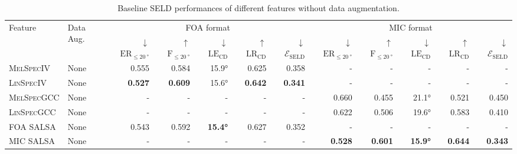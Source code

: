 \documentclass[journal]{IEEEtran}
\begin{document}
\begin{table*}[t]
    \centering
    \caption{Baseline SELD performances of different features without data augmentation.}
    \noindent\begin{tabularx}{\textwidth}{Xl rrrrr rrrrr}
    \toprule 
        \multirow{2}[2]{*}{Feature} & 
        \multirow{2}[2]{*}{Data Aug.} &  
        \multicolumn{5}{c}{FOA format} &
        \multicolumn{5}{c}{MIC format}
    \\ \cmidrule(lr){3-7}\cmidrule(lr){8-12}
        & & 
        $\downarrow$ $\text{ER}_{\le \SI{20}{\degree}}$ &
        $\uparrow$ $\text{F}_{\le \SI{20}{\degree}}$ &
        $\downarrow$ $\text{LE}_\text{CD}$&
        $\uparrow$ $\text{LR}_\text{CD}$ &
        $\downarrow$ $\mathcal{E}_\text{SELD}$ &
        $\downarrow$ $\text{ER}_{\le \SI{20}{\degree}}$ &
        $\uparrow$ $\text{F}_{\le \SI{20}{\degree}}$ &
        $\downarrow$ $\text{LE}_\text{CD}$&
        $\uparrow$ $\text{LR}_\text{CD}$ &
        $\downarrow$ $\mathcal{E}_\text{SELD}$
        \\ \midrule
        \textsc{MelSpecIV}   & None 
                    & 0.555 & 0.584 & 15.9\si{\degree} & 0.625 & 0.358 
                    & - & - & - & - & - \\
        \textsc{LinSpecIV}   & None
                    & \bf{0.527} & \bf{0.609} & 15.6\si{\degree} & \bf{0.642} & \bf{0.341}
                    & - & - & - & - & - \\
        \textsc{MelSpecGCC}  & None
                    & - & - & - & - & - 
                    & 0.660 & 0.455 & 21.1\si{\degree} & 0.521 & 0.450 \\ 
        \textsc{LinSpecGCC}  & None
                    & - & - & - & - & - 
                    & 0.622 & 0.506 & 19.6\si{\degree} & 0.583 & 0.410 \\
        \midrule
        FOA SALSA       & None
                    & 0.543 & 0.592 & \bf{15.4\si{\degree}} & 0.627 & 0.352 
                    & - & - & - & - & -  \\
        MIC SALSA       & None
                    & - & - & - & - & - 
                    & \bf{0.528} & \bf{0.601} & \bf{15.9\si{\degree}} & \bf{0.644} & \bf{0.343} \\
    \bottomrule
    \end{tabularx}
    \label{tab:baseline_noaug}
\end{table*}
\end{document}
